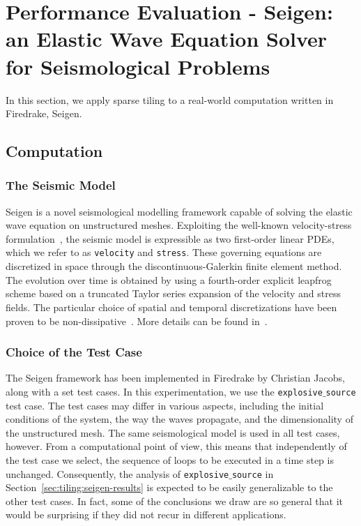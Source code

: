 \section{Performance Evaluation - Seigen: an Elastic Wave Equation Solver for Seismological Problems}
\label{sec:tiling:seigen}
In this section, we apply sparse tiling to a real-world computation written in Firedrake, Seigen. 

\subsection{Computation}

\subsubsection{The Seismic Model}
Seigen is a novel seismological modelling framework capable of solving the elastic wave equation on unstructured meshes. Exploiting the well-known velocity-stress formulation~\citep{Seigen-3}, the seismic model is expressible as two first-order linear PDEs, which we refer to as {\tt velocity} and {\tt stress}. These governing equations are discretized in space through the discontinuous-Galerkin finite element method. The evolution over time is obtained by using a fourth-order explicit leapfrog scheme based on a truncated Taylor series expansion of the velocity and stress fields. The particular choice of spatial and temporal discretizations have been proven to be non-dissipative~\citep{Seigen-1}. More details can be found in~\cite{Seigen-paper}.

\subsubsection{Choice of the Test Case}
The Seigen framework has been implemented in Firedrake by Christian Jacobs, along with a set test cases. In this experimentation, we use the {\tt explosive$\_$source} test case. The test cases may differ in various aspects, including the initial conditions of the system, the way the waves propagate, and the dimensionality of the unstructured mesh. The same seismological model is used in all test cases, however. From a computational point of view, this means that independently of the test case we select, the sequence of loops to be executed in a time step is unchanged. Consequently, the analysis of {\tt explosive$\_$source} in Section~\ref{sec:tiling:seigen-results} is expected to be easily generalizable to the other test cases. In fact, some of the conclusions we draw are so general that it would be surprising if they did not recur in different applications. 

